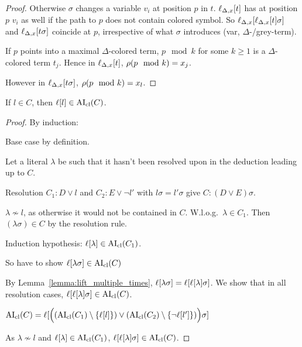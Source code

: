 \documentclass[,%
	paper=a4,%
	DIV14, 
	liststotoc,
	bibtotoc,
	draft=false,%
	numbers=noendperiod
]{scrartcl}
\begin{document}
\begin{proof}
{  Otherwise $\sigma$ changes a variable $v_i$ at position $p$ in $t$.
  $\ell_{\Delta,x}[t]$ has at position $p$ $v_i$ as well if the path to $p$ does not contain colored symbol.
  So $\ell_{\Delta,x}[\ell_{\Delta,x}[t]\sigma]$ and $\ell_{\Delta,x}[t\sigma]$ coincide at $p$, irrespective of what $\sigma$ introduces (var,   $\Delta$-/grey-term).

  If $p$ points into a maximal $\Delta$-colored term, $p\mod k$ for some $k\geq 1$ is a $\Delta$-colored term $t_j$.
  Hence in $\ell_{\Delta,x}[t]$, $\operatorname{{\rho}}(p\mod k) = x_j$.

  However in $\ell_{\Delta,x}[t\sigma]$, $\operatorname{{\rho}}(p\mod k) = x_l$.
}
\end{proof}

\begin{lemma}

  If $l \in C$, then $\ell[l] \in \operatorname{AI}_\mathrm{cl}(C)$.
  \label{lemma:literals_in_aiclause}
\end{lemma}
\begin{proof} By induction:

  Base case by definition.

  Let a literal $\lambda$ be such that it hasn't been resolved upon in the deduction leading up to $C$.

  Resolution $C_1 : D \lor l$ and $C_2 : E \lor \lnot l'$ with $l\sigma = l'\sigma$ give $C: (D\lor E)\sigma$.

  $\lambda \not\sim l$, as otherwise it would not be contained in $C$.
  W.l.o.g.\ $\lambda \in C_1$.
  Then $(\lambda\sigma) \in C$ by the resolution rule.

  Induction hypothesis: $\ell[\lambda] \in \operatorname{AI}_\mathrm{cl}(C_1)$.

  So have to show $ \ell[\lambda\sigma] \in \operatorname{AI}_\mathrm{cl}(C)$ 

  By Lemma~\ref{lemma:lift_multiple_times},
  $\ell[\lambda\sigma] = \ell[\ell[\lambda]\sigma]$.
  We show that in all resolution cases, $\ell[\ell[\lambda] \sigma] \in \operatorname{AI}_\mathrm{cl}(C)$.

      $\operatorname{AI}_\mathrm{cl}(C) = \ell[ \Big( (\operatorname{AI}_\mathrm{cl}(C_1) \setminus \{\ell[l]\}) \lor (\operatorname{AI}_\mathrm{cl}(C_2) \setminus \{\lnot         \ell[l']\}) \Big) \sigma] $

      As $\lambda \not\sim l$ and $\ell[\lambda] \in \operatorname{AI}_\mathrm{cl}(C_1)$, $\ell[\ell[\lambda] \sigma] \in \operatorname{AI}_\mathrm{cl}(C)  $.
\end{proof}
\end{document}
